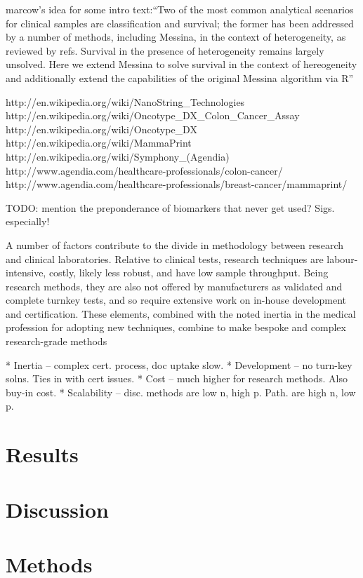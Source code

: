 \documentclass[dissertation.tex]{subfiles}
\begin{document}
marcow’s idea for some intro text:``Two of the most common analytical scenarios for clinical samples are classification and survival; the former has been addressed by a number of methods, including Messina, in the context of heterogeneity, as reviewed by refs. Survival in the presence of heterogeneity remains largely unsolved. Here we extend Messina to solve
survival in the context of hereogeneity and additionally extend the capabilities of the original Messina algorithm via R''

http://en.wikipedia.org/wiki/NanoString_Technologies
http://en.wikipedia.org/wiki/Oncotype_DX_Colon_Cancer_Assay
http://en.wikipedia.org/wiki/Oncotype_DX
http://en.wikipedia.org/wiki/MammaPrint
http://en.wikipedia.org/wiki/Symphony_(Agendia)
http://www.agendia.com/healthcare-professionals/colon-cancer/
http://www.agendia.com/healthcare-professionals/breast-cancer/mammaprint/


TODO: mention the preponderance of biomarkers that never get used?  Sigs. especially!

A number of factors contribute to the divide in methodology between research and clinical laboratories.  Relative to clinical tests, research techniques are labour-intensive, costly, likely less robust, and have low sample throughput.  Being research methods, they are also not offered by manufacturers as validated and complete turnkey tests, and so require extensive work on in-house development and certification.  These elements, combined with the noted inertia in the medical profession for adopting new techniques, combine to make bespoke and complex research-grade methods 

* Inertia -- complex cert. process, doc uptake slow.
* Development -- no turn-key solns.  Ties in with cert issues.
* Cost -- much higher for research methods.  Also buy-in cost.
* Scalability -- disc. methods are low n, high p.  Path. are high n, low p.


\section{Results}

\section{Discussion}

\section{Methods}
\end{document}
